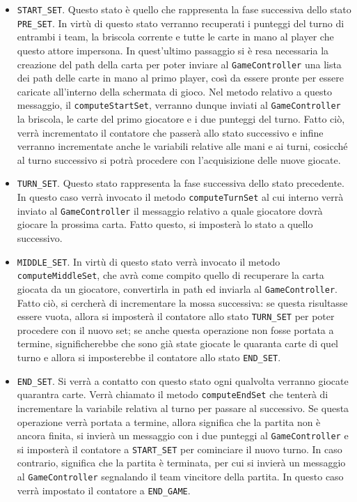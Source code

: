 \begin{itemize}
\begin {itemize}
     \item \texttt{START\_SET}. Questo stato è quello che rappresenta la fase successiva dello stato \texttt{PRE\_SET}. In virtù di questo stato verranno recuperati i punteggi del turno di entrambi i team, la briscola corrente e tutte le carte in mano al player che questo attore impersona. In quest'ultimo passaggio si è resa necessaria la creazione del path della carta per poter inviare al \texttt{GameController} una lista dei path delle carte in mano al primo player, così da essere pronte per essere caricate all'interno della schermata di gioco. Nel metodo relativo a questo messaggio, il \texttt{computeStartSet}, verranno dunque inviati al \texttt{GameController} la briscola, le carte del primo giocatore e i due punteggi del turno. Fatto ciò, verrà incrementato il contatore che passerà allo stato successivo e infine verranno incrementate anche le variabili relative alle mani e ai turni, cosicché al turno successivo si potrà procedere con l'acquisizione delle nuove giocate.

   \item \texttt{TURN\_SET}. Questo stato rappresenta la fase successiva dello stato precedente. In questo caso verrà invocato il metodo \texttt{computeTurnSet} al cui interno verrà inviato al \texttt{GameController} il messaggio relativo a quale giocatore dovrà giocare la prossima carta. Fatto questo, si imposterà lo stato a quello successivo.

     \item \texttt{MIDDLE\_SET}. In virtù di questo stato verrà invocato il metodo \texttt{computeMiddleSet}, che avrà come compito quello di recuperare la carta giocata da un giocatore, convertirla in path ed inviarla al \texttt{GameController}. Fatto ciò, si cercherà di incrementare la mossa successiva: se questa risultasse essere vuota, allora si imposterà il contatore allo stato \texttt{TURN\_SET} per poter procedere con il nuovo set; se anche questa operazione non fosse portata a termine, significherebbe che sono già state giocate le quaranta carte di quel turno e allora si imposterebbe il contatore allo stato \texttt{END\_SET}.

     \item \texttt{END\_SET}. Si verrà a contatto con questo stato ogni qualvolta verranno giocate quarantra carte. Verrà chiamato il metodo \texttt{computeEndSet} che tenterà di incrementare la variabile relativa al turno per passare al successivo. Se questa operazione verrà portata a termine, allora significa che la partita non è ancora finita, si invierà un messaggio con i due punteggi al \texttt{GameController} e si imposterà il contatore a \texttt{START\_SET} per cominciare il nuovo turno. In caso contrario, significa che la partita è terminata, per cui si invierà un messaggio al \texttt{GameController} segnalando il team vincitore della partita. In questo caso verrà impostato il contatore a \texttt{END\_GAME}.


\end{itemize}
\end{itemize}
